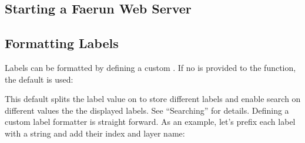 \documentclass[letterpaper,10pt,english]{sphinxmanual}
\begin{document}
\subsection{Starting a Faerun Web Server}
\label{\detokenize{host:starting-a-faerun-web-server}}
\begin{sphinxVerbatim}[commandchars=\\\{\}]
   

 
\end{sphinxVerbatim}


\subsection{Formatting Labels}
\label{\detokenize{host:formatting-labels}}
Labels can be formatted by defining a custom . If no  is provided to the  function, the default is used:

\begin{sphinxVerbatim}[commandchars=\\\{\}]
      \PYG{p}{[}\PYG{p}{]}
\end{sphinxVerbatim}

This default splits the label value on  to store different labels and enable search on different values the the displayed labels. See “Searching” for details. Defining a custom label formatter is straight forward. As an example, let’s prefix each label with a string and add their index and layer name:

\begin{sphinxVerbatim}[commandchars=\\\{\}]
   
     

 
      
\end{sphinxVerbatim}
\end{document}

